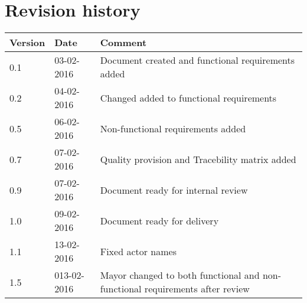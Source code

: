 \label{chp_revisionHistory}
\chapter{Revision history}

\begin{longtable}{| p{1.5cm}  | p{3cm} |  p{8cm} | }
	\hline
	\textbf{Version} & \textbf{Date} & \textbf{Comment} \\
	\hline
	0.1 & 03-02-2016 & Document created and functional requirements added  \\
	\hline
	0.2 & 04-02-2016 & Changed added to functional requirements \\
	\hline
	0.5 & 06-02-2016 & Non-functional requirements added \\
	\hline
	0.7 & 07-02-2016 & Quality provision and Tracebility matrix added \\
	\hline
	0.9 & 07-02-2016 & Document ready for internal review \\
	\hline
	1.0 & 09-02-2016 & Document ready for delivery \\
	\hline
	1.1 & 13-02-2016 & Fixed actor names \\
	\hline
	1.5 & 013-02-2016 & Mayor changed to both functional and non-functional requirements after review \\
	\hline
\end{longtable}

